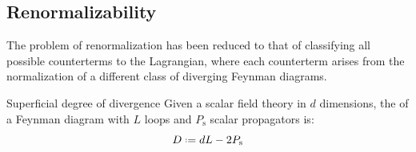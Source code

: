 \subsection{Renormalizability}

The problem of renormalization has been reduced to that of classifying all possible counterterms to the Lagrangian, where each counterterm arises from the normalization of a different class of diverging Feynman diagrams.

\begin{definition}{Superficial degree of divergence}{}
  Given a scalar field theory in $ d $ dimensions, the  of a Feynman diagram with $ L $ loops and $ P_\text{s} $ scalar propagators is:
  \begin{equation}
    D \defeq d L - 2 P_\text{s}
    \label{eq:sup-deg-div-def}
  \end{equation}
\end{definition}

